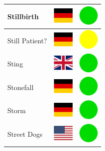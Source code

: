 \documentclass[12pt, a4paper, twoside]{report}
\begin{document}
\begin{center}
\begin{longtable}{|p{5cm}|p{2cm}|p{2cm}|}
 Stillbirth                                                 & \includegraphics[width=1cm]{../4x3/de} &   \includegraphics[width=1cm]{../likes/y} \\ \hline
 Still Patient?                                             & \includegraphics[width=1cm]{../4x3/de} &   \includegraphics[width=1cm]{../likes/m} \\ \hline
 Sting                                                      & \includegraphics[width=1cm]{../4x3/gb} &   \includegraphics[width=1cm]{../likes/y} \\ \hline
 Stonefall                                                  & \includegraphics[width=1cm]{../4x3/de} &   \includegraphics[width=1cm]{../likes/y} \\ \hline
 Storm                                                      & \includegraphics[width=1cm]{../4x3/de} &   \includegraphics[width=1cm]{../likes/y} \\ \hline
 Street Dogs                                                & \includegraphics[width=1cm]{../4x3/us} &   \includegraphics[width=1cm]{../likes/y} \\ \hline

\end{longtable}
\end{center}
\end{document}

